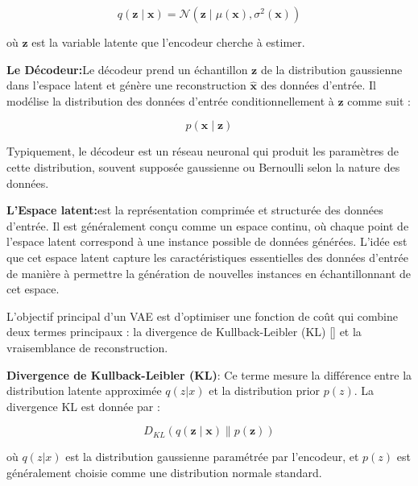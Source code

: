 \begin{equation}
	q(\mathbf{z} \mid \mathbf{x}) = \mathcal{N}(\mathbf{z} \mid \mu(\mathbf{x}), \sigma^2(\mathbf{x}))
	\label{equ:couche}
\end{equation}

où \(\mathbf{z}\) est la variable latente que l'encodeur cherche à estimer.

\medskip

\textbf{Le Décodeur:}Le décodeur prend un échantillon \(\mathbf{z}\) de la distribution gaussienne dans
l'espace latent et génère une reconstruction \(\hat{\mathbf{x}}\) des données d'entrée. Il modélise la distribution
des données d'entrée conditionnellement à \(\mathbf{z}\) comme suit :

\begin{equation}
	p(\mathbf{x} \mid \mathbf{z})
	\label{equ:couche}
\end{equation}

Typiquement, le décodeur est un réseau neuronal qui produit les paramètres de
cette distribution, souvent supposée gaussienne ou Bernoulli selon la nature
des données.

\medskip

\textbf{L'Espace latent:}est la représentation comprimée et structurée des données d'entrée.
Il est généralement conçu comme un espace continu, où chaque point de l'espace latent correspond à une instance
possible de données générées. L'idée est que cet espace latent capture les caractéristiques essentielles
des données d'entrée de manière à permettre
la génération de nouvelles instances en échantillonnant de cet espace.

L’objectif principal d’un VAE est d’optimiser une fonction de coût qui combine
deux termes principaux : la divergence de Kullback-Leibler (KL)
[\cite{johnson2001symmetrizing}] et la vraisemblance de reconstruction.

\textbf{Divergence de Kullback-Leibler (KL)}: Ce terme mesure la différence entre la distribution latente approximée \( q(z | x) \) et la distribution prior \( p(z) \). La divergence KL est donnée par :


\begin{equation}
    D_{KL}(q(\mathbf{z} \mid \mathbf{x}) \parallel p(\mathbf{z}))
\end{equation}

où \( q(z | x) \) est la distribution gaussienne paramétrée par l'encodeur, et
\( p(z) \) est généralement choisie comme une distribution normale standard.

